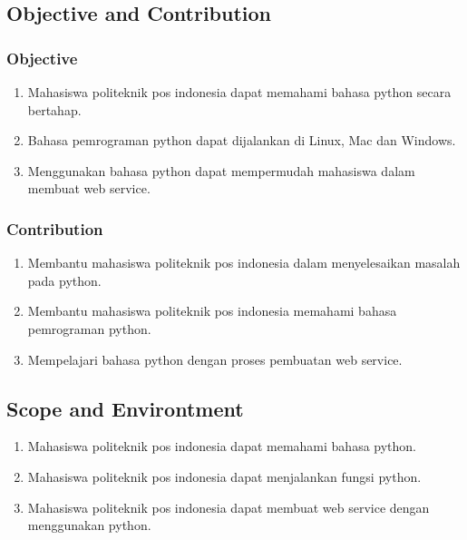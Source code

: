 \subsection{Objective and Contribution}
	\subsubsection{Objective}
		\begin{enumerate}
			\item Mahasiswa politeknik pos indonesia dapat memahami bahasa python secara bertahap.
			\item Bahasa pemrograman python dapat dijalankan di Linux, Mac dan Windows.
			\item Menggunakan bahasa python dapat mempermudah mahasiswa dalam membuat web service.
		\end{enumerate}
	\subsubsection{Contribution}
		\begin{enumerate}
			\item Membantu mahasiswa politeknik pos indonesia dalam menyelesaikan masalah pada python.
			\item Membantu mahasiswa politeknik pos indonesia memahami bahasa pemrograman python.
			\item Mempelajari bahasa python dengan proses pembuatan web service.
		\end{enumerate}
			
\subsection{Scope and Environtment}
		\begin{enumerate}
			\item Mahasiswa politeknik pos indonesia dapat memahami bahasa python.
			\item Mahasiswa politeknik pos indonesia dapat menjalankan fungsi python.
			\item Mahasiswa politeknik pos indonesia dapat membuat web service dengan menggunakan python.
		\end{enumerate}
